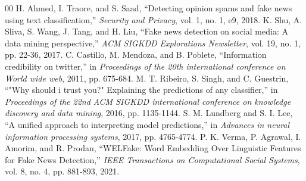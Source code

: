 \documentclass[conference]{IEEEtran}
\begin{document}
\begin{thebibliography}{00}
 H. Ahmed, I. Traore, and S. Saad, ``Detecting opinion spams and fake news using text classification,'' \textit{Security and Privacy}, vol. 1, no. 1, e9, 2018.
 K. Shu, A. Sliva, S. Wang, J. Tang, and H. Liu, ``Fake news detection on social media: A data mining perspective,'' \textit{ACM SIGKDD Explorations Newsletter}, vol. 19, no. 1, pp. 22-36, 2017.
 C. Castillo, M. Mendoza, and B. Poblete, ``Information credibility on twitter,'' in \textit{Proceedings of the 20th international conference on World wide web}, 2011, pp. 675-684.
 M. T. Ribeiro, S. Singh, and C. Guestrin, ``"Why should i trust you?" Explaining the predictions of any classifier,'' in \textit{Proceedings of the 22nd ACM SIGKDD international conference on knowledge discovery and data mining}, 2016, pp. 1135-1144.
 S. M. Lundberg and S. I. Lee, ``A unified approach to interpreting model predictions,'' in \textit{Advances in neural information processing systems}, 2017, pp. 4765-4774.
 P. K. Verma, P. Agrawal, I. Amorim, and R. Prodan, ``WELFake: Word Embedding Over Linguistic Features for Fake News Detection,'' \textit{IEEE Transactions on Computational Social Systems}, vol. 8, no. 4, pp. 881-893, 2021.
\end{thebibliography}
\end{document}
